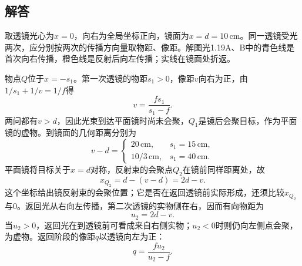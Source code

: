 \documentclass[UTF8,fontset=fandol,a4paper,11pt]{ctexart}
\begin{document}
\subsection*{解答}


取透镜光心为$x=0$，向右为全局坐标正向，镜面为$x=d=10\,\mathrm{cm}$。同一透镜受光两次，应分别按两次的传播方向量取物距、像距。解图光1.19A、B中的青色线是首次向右传播，橙色线是反射后向左传播；实线在镜面处折返。

物点$Q$位于$x=-s_1$。第一次透镜的物距$s_1>0$，像距$v$向右为正，由$1/s_1+1/v=1/f$得
\[
v=\frac{fs_1}{s_1-f}.
\]
两问都有$v>d$，因此光束到达平面镜时尚未会聚，$Q_1$是镜后会聚目标，作为平面镜的虚物。到镜面的几何距离分别为
\[
v-d=\begin{cases}
20\,\mathrm{cm},&s_1=15\,\mathrm{cm},\\[2pt]
10/3\,\mathrm{cm},&s_1=40\,\mathrm{cm}.
\end{cases}
\]
平面镜将目标关于$x=d$对称，反射束的会聚点$Q_2$在镜前同样距离处，故
\[
x_{Q_2}=d-(v-d)=2d-v.
\]
这个坐标给出镜反射束的会聚位置；它是否在返回透镜前实际形成，还须比较$x_{Q_2}$与0。返回光从右向左传播，第二次透镜的实物侧在右，因而有向物距为
\[
u_2=2d-v.
\]
当$u_2>0$，返回光在到透镜前可看成来自右侧实物；$u_2<0$时则仍向左侧点会聚，为虚物。返回阶段的像距$q$以透镜向左为正：
\[
\boxed{q=\frac{fu_2}{u_2-f}}.
\]
\end{document}
